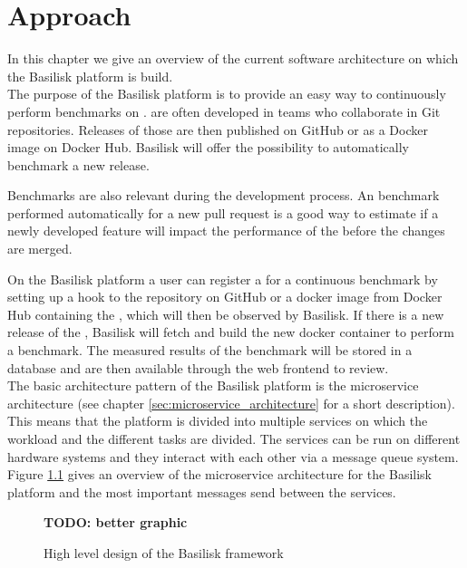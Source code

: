 \chapter{Approach}
\label{ch:approach}

In this chapter we give an overview of the current software architecture on which the Basilisk platform is build.
\\

The purpose of the Basilisk platform is to provide an easy way to continuously perform benchmarks on \tsp{}.
\tsp{} are often developed in teams who collaborate in Git repositories.
Releases of those \tsp{} are then published on GitHub or as a Docker image on Docker Hub.
Basilisk will offer the possibility to automatically benchmark a new \tsp{} release.

Benchmarks are also relevant during the development process.
An benchmark performed automatically for \eg{} a new pull request is a good way to estimate if a newly developed feature will impact the performance of the \ts{} before the changes are merged.

On the Basilisk platform a user can register a \ts{} for a continuous benchmark by setting up a hook to the repository on GitHub or a docker image from Docker Hub containing the \ts{}, which will then be observed by Basilisk.
If there is a new release of the \ts{}, Basilisk will fetch and build the new docker container to perform a benchmark.
The measured results of the benchmark will be stored in a database and are then available through the web frontend to review.
\\

The basic architecture pattern of the Basilisk platform is the microservice architecture (see chapter \ref{sec:microservice_architecture} for a short description). 
This means that the platform is divided into multiple services on which the workload and the different tasks are divided.
The services can be run on different hardware systems and they interact with each other via a message queue system.
\\

Figure \ref{fig:basilisk_high_level_design} gives an overview of the microservice architecture for the Basilisk platform and the most important messages send between the services.
\begin{figure}[tbph]
	\centering
	\textbf{TODO: better graphic}
	\caption{High level design of the Basilisk framework}
	\label{fig:basilisk_high_level_design}
\end{figure}
\\

